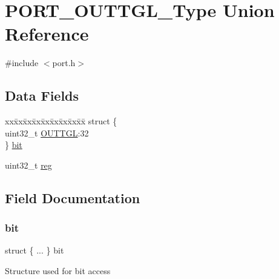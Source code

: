 \hypertarget{union_p_o_r_t___o_u_t_t_g_l___type}{}\section{P\+O\+R\+T\+\_\+\+O\+U\+T\+T\+G\+L\+\_\+\+Type Union Reference}
\label{union_p_o_r_t___o_u_t_t_g_l___type}


{\ttfamily \#include $<$port.\+h$>$}

\subsection*{Data Fields}
\begin{DoxyCompactItemize}
\item 
\begin{tabbing}
xx\=xx\=xx\=xx\=xx\=xx\=xx\=xx\=xx\=\kill
struct \{\\
\>uint32\_t \mbox{\hyperlink{union_p_o_r_t___o_u_t_t_g_l___type_a406baee36623c040bcda3b636cb07f05}{OUTTGL}}:32\\
\} \mbox{\hyperlink{union_p_o_r_t___o_u_t_t_g_l___type_ae4535a6b57ac4650a7bd2f011f97fe4d}{bit}}\\

\end{tabbing}\item 
uint32\+\_\+t \mbox{\hyperlink{union_p_o_r_t___o_u_t_t_g_l___type_a6b91636401516a477989a336376d7b40}{reg}}
\end{DoxyCompactItemize}


\subsection{Field Documentation}
\mbox{\label{union_p_o_r_t___o_u_t_t_g_l___type_ae4535a6b57ac4650a7bd2f011f97fe4d}} 
\subsubsection{\texorpdfstring{bit}{bit}}
{\footnotesize\ttfamily struct \{ ... \}   bit}

Structure used for bit access \mbox{\label{union_p_o_r_t___o_u_t_t_g_l___type_a406baee36623c040bcda3b636cb07f05}} 
